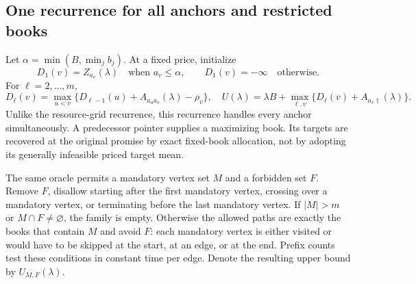 \subsection{One recurrence for all anchors and restricted books}
Let $\alpha=\min(B,\min_jb_j)$. At a fixed price, initialize
\[
 D_1(v)=Z_{a_v}(\lambda)\quad\text{when }a_v\leq\alpha,
 \qquad D_1(v)=-\infty\quad\text{otherwise}.
\]
For $\ell=2,\ldots,m$,
\begin{equation}\label{eq:pricedDP54}
 D_\ell(v)=\max_{u<v}\{D_{\ell-1}(u)+A_{a_u a_v}(\lambda)-\rho_v\},
 \quad
 U(\lambda)=\lambda B+\max_{\ell,v}\{D_\ell(v)+A_{a_v\dagger}(\lambda)\}.
\end{equation}
Unlike the resource-grid recurrence, this recurrence handles every anchor simultaneously. A predecessor pointer supplies a maximizing book. Its targets are recovered at the original promise by exact fixed-book allocation, not by adopting its generally infeasible priced target mean.

The same oracle permits a mandatory vertex set $M$ and a forbidden set $F$. Remove $F$, disallow starting after the first mandatory vertex, crossing over a mandatory vertex, or terminating before the last mandatory vertex. If $|M|>m$ or $M\cap F\ne\varnothing$, the family is empty. Otherwise the allowed paths are exactly the books that contain $M$ and avoid $F$: each mandatory vertex is either visited or would have to be skipped at the start, at an edge, or at the end. Prefix counts test these conditions in constant time per edge. Denote the resulting upper bound by $U_{M,F}(\lambda)$.

